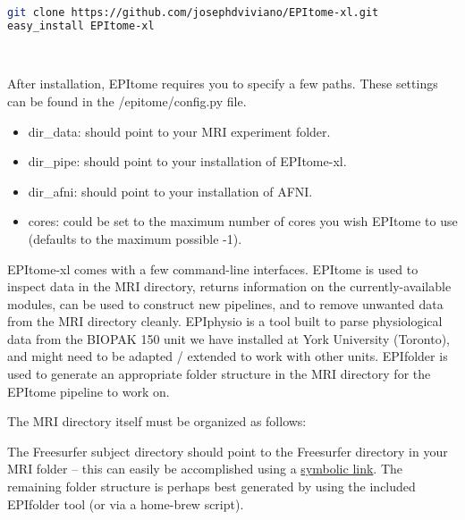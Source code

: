 \documentclass[final,titlepage,letterpaper,oneside,12pt]{article}
\renewcommand{\texttt}[2][BrickRed]{\textcolor{#1}{\ttfamily #2}}%
\begin{document}
\begin{lstlisting}[language=bash,frame=L,basicstyle=\footnotesize\ttfamily]
git clone https://github.com/josephdviviano/EPItome-xl.git
easy_install EPItome-xl
\end{lstlisting}
\

After installation, EPItome requires you to specify a few paths. These settings can be found in the /epitome/config.py file.

\begin{itemize}
    \item{\texttt{dir\_data}: should point to your MRI experiment folder.}
    \item{\texttt{dir\_pipe}: should point to your installation of EPItome-xl.}
    \item{\texttt{dir\_afni}: should point to your installation of AFNI.}
    \item{\texttt{cores}: could be set to the maximum number of cores you wish EPItome to use (defaults to the maximum possible -1).}
\end{itemize}

EPItome-xl comes with a few command-line interfaces. \texttt{EPItome} is used to inspect data in the MRI directory, returns information on the currently-available modules, can be used to construct new pipelines, and to remove unwanted data from the MRI directory cleanly. \texttt{EPIphysio} is a tool built to parse physiological data from the BIOPAK 150 unit we have installed at York University (Toronto), and might need to be adapted / extended to work with other units. \texttt{EPIfolder} is used to generate an appropriate folder structure in the MRI directory for the EPItome pipeline to work on.

The MRI directory itself must be organized as follows: \\


\noindent
The Freesurfer subject directory should point to the Freesurfer directory in your MRI folder -- this can easily be accomplished using a \href{https://kb.iu.edu/d/abbe}{symbolic link}. The remaining folder structure is perhaps best generated by using the included \texttt{EPIfolder} tool (or via a home-brew script).
\end{document}
